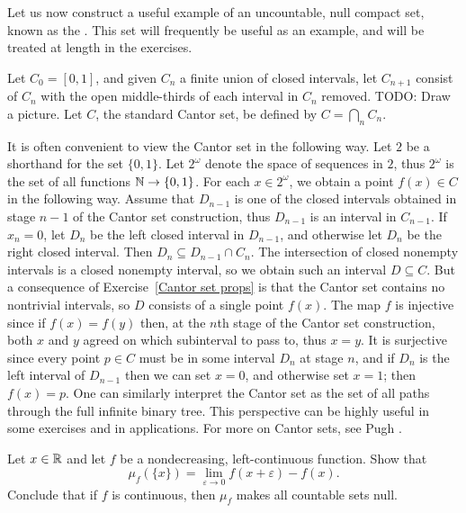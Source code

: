 \begin{subsec}
Let us now construct a useful example of an uncountable, null compact set, known as the .
This set will frequently be useful as an example, and will be treated at length in the exercises.

Let $C_0 = [0, 1]$, and given $C_{n}$ a finite union of closed intervals, let $C_{n+1}$ consist of $C_{n}$ with the open middle-thirds of each interval in $C_{n}$ removed. TODO: Draw a picture.
Let $C$, the standard Cantor set, be defined by $C = \bigcap_{n} C_{n}$.
\end{subsec}

\begin{subsec}
It is often convenient to view the Cantor set in the following way. Let $2$ be a shorthand for the set $\{0, 1\}$.
Let $2^\omega$ denote the space of sequences in $2$, thus $2^\omega$ is the set of all functions $\mathbb{N} \to \{0, 1\}$.
For each $x \in 2^\omega$, we obtain a point $f(x) \in C$ in the following way.
Assume that $D_{n-1}$ is one of the closed intervals obtained in stage $n-1$ of the Cantor set construction, thus $D_{n-1}$ is an interval in $C_{n-1}$.
If $x_{n} = 0$, let $D_{n}$ be the left closed interval in $D_{n-1}$, and otherwise let $D_{n}$ be the right closed interval.
Then $D_{n} \subseteq D_{n-1} \cap C_{n}$.
The intersection of closed nonempty intervals is a closed nonempty interval, so we obtain such an interval $D \subseteq C$.
But a consequence of Exercise~\ref{Cantor set props} is that the Cantor set contains no nontrivial intervals, so $D$ consists of a single point $f(x)$.
The map $f$ is injective since if $f(x) = f(y)$ then, at the $n$th stage of the Cantor set construction, both $x$ and $y$ agreed on which subinterval to pass to, thus $x = y$.
It is surjective since every point $p \in C$ must be in some interval $D_{n}$ at stage $n$, and if $D_{n}$ is the left interval of $D_{n-1}$ then we can set $x = 0$, and otherwise set $x = 1$; then $f(x) = p$.
One can similarly interpret the Cantor set as the set of all paths through the full infinite binary tree.
This perspective can be highly useful in some exercises and in applications.
For more on Cantor sets, see Pugh \cite[Chapter 2]{pugh2013real}.
\end{subsec}

\begin{exercise}
Let $x \in \mathbb{R}$ and let $f$ be a nondecreasing, left-continuous function. Show that
\[\mu_f(\{x\}) = \lim_{\varepsilon \to 0} f(x+\varepsilon) - f(x).\]
Conclude that if $f$ is continuous, then $\mu_f$ makes all countable sets null.
\end{exercise}

